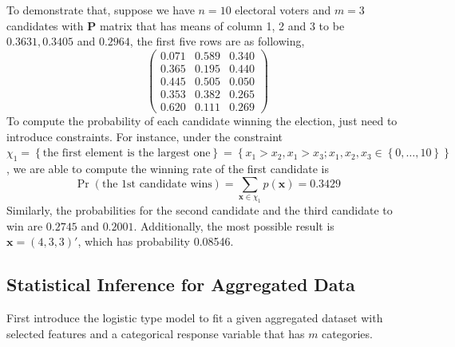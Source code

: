\documentclass[12pt]{article}
\newcommand{\Pmat}{\mathbf{P}}
\newcommand{\xvec}{\boldsymbol{x}}
\begin{document}
To demonstrate that, suppose we have $n=10$ electoral voters and $m=3$ candidates with $\Pmat$ matrix that has means of column 1, 2 and 3 to be $0.3631,0.3405$ and $0.2964$, the first five rows are as following,
\begin{equation*}
\begin{pmatrix}
0.071 & 0.589 & 0.340\\
0.365 & 0.195 & 0.440\\
0.445 & 0.505 & 0.050\\
0.353 & 0.382 & 0.265\\
0.620 & 0.111 & 0.269
    \end{pmatrix}
\end{equation*}
To compute the probability of each candidate winning the election, just need to introduce constraints. For instance, under the constraint $\chi_1 = \left\{\text{the first element is the largest one}\right\} = \left\{x_1>x_2, x_1>x_3; x_1, x_2,x_3 \in \left\{0,\dots,10\right\}\right\}$, we are able to compute the winning rate of the first candidate is
\begin{equation*}
\Pr(\text{the 1st candidate wins}) = \sum_{\xvec \in \chi_{1}} p(\xvec) = 0.3429
\end{equation*}
Similarly, the probabilities for the second candidate and the third candidate to win are $0.2745$ and $0.2001$. Additionally, the most possible result is $\xvec=(4,3,3)'$, which has probability 0.08546.




\subsection{Statistical Inference for Aggregated Data}\label{sec:model.est.inf}	
First introduce the logistic type model to fit a given aggregated dataset with selected features and a categorical response variable that has $m$ categories.
\end{document}
